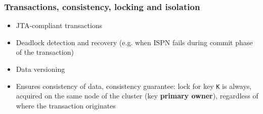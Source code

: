 \documentclass[10pt,utf8]{beamer}
\begin{document}
\begin{frame}
	\frametitle{Transactions, consistency, locking and isolation}
	\begin{itemize}
		\item JTA-compliant transactions
		\pause
		\item Deadlock detection and recovery (e.g. when ISPN fails during commit phase of the transaction)
		\pause
		\item Data versioning
		\pause
		\item Ensures consistency of data, consistency guarantee: 
		lock for key \texttt{K} is always, acquired on the same node of the cluster (key \textbf{primary owner}), regardless of where the transaction originates
	\end{itemize}
\end{frame}
\end{document}
